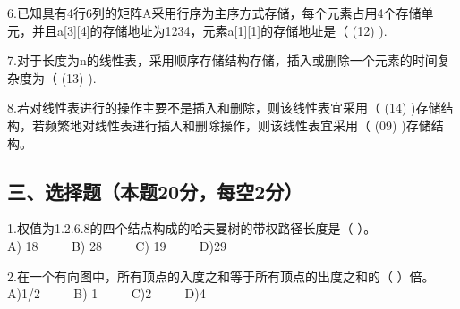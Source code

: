6.已知具有4行6列的矩阵A采用行序为主序方式存储，每个元素占用4个存储单元，并且a[3][4]的存储地址为1234，元素a[1][1]的存储地址是（ (12) ).

7.对于长度为n的线性表，采用顺序存储结构存储，插入或删除一个元素的时间复杂度为（ (13) ).

8.若对线性表进行的操作主要不是插入和删除，则该线性表宜采用（ (14) )存储结构，若频繁地对线性表进行插入和删除操作，则该线性表宜采用（ (09) )存储结构。

\subsection{三、选择题（本题20分，每空2分）}
1.权值为{1.2.6.8}的四个结点构成的哈夫曼树的带权路径长度是（  ）。 \\
A) 18 $\qquad$ B) 28 $\qquad$ C) 19 $\qquad$ D)29

2.在一个有向图中，所有顶点的入度之和等于所有顶点的出度之和的（ ）倍。 \\
A)1/2 $\qquad$ B) 1 $\qquad$ C)2 $\qquad$ D)4

